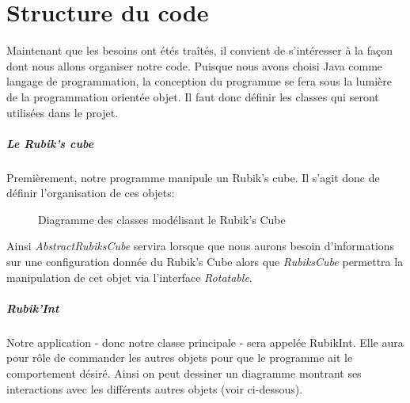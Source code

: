 \chapter{Structure du code}

Maintenant que les besoins ont étés traîtés, il convient de s'intéresser à la façon dont nous allons organiser notre code. 
Puisque nous avons choisi Java comme langage de programmation, la conception du programme se fera sous la lumière de la programmation orientée objet. 
Il faut donc définir les classes qui seront utilisées dans le projet.

\paragraph{Le Rubik's cube} Premièrement, notre programme manipule un Rubik's cube. 
Il s'agit donc de définir l'organisation de ces objets:

\begin{figure}[h]
\begin{center}
\end{center}
    \caption{Diagramme des classes modélisant le Rubik's Cube}
\end{figure}

Ainsi \textit{AbstractRubiksCube} servira lorsque que nous aurons besoin d'informations sur une configuration donnée du Rubik's Cube alors que \textit{RubiksCube} permettra la manipulation de cet objet via l'interface \textit{Rotatable}. 


\paragraph{Rubik'Int} Notre application - donc notre classe principale - sera appelée RubikInt. Elle aura pour rôle de commander les autres objets pour que le programme ait le comportement désiré. Ainsi on peut dessiner un diagramme montrant ses interactions avec les différents autres objets (voir ci-dessous).

